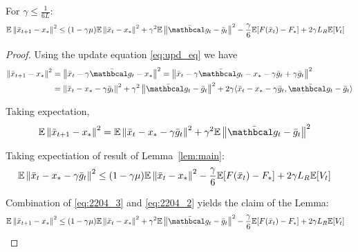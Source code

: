 \begin{lemma} \label{lem:very_main}
    For $\gamma \leq \frac{1}{6L}$:
    \begin{align}
        \E \norm{\bar{x}_{t+1}-x_*}^2
        &\leq (1 - \gamma \mu) \E \norm{\bar{x}_t - x_*}^2 
        + \gamma^2 \E \norm{ \bar{\mc{g_t}} - \bar{g}_t}^2
        - \frac{\gamma}{6} \E [F(\bar{x}_t) - F_*] 
        + 2 \gamma L_R \E [V_t]
    \end{align}
\end{lemma}
\begin{proof}
    Using the update equation \eqref{eq:upd_eq} we have
    \begin{align}
        \norm{\bar{x}_{t+1}-x_*}^2
        &= \norm{\bar{x}_{t} - \gamma \bar {\mc{g_t}} - x_*}^2
        = \norm{\bar{x}_{t} - \gamma \bar {\mc{g_t}} - x_* - \gamma \bar{g}_t + \gamma \bar{g}_t}^2 \\
        &= \norm{\bar{x}_t - x_* - \gamma \bar{g}_t}^2 
        + \gamma^2 \norm{\bar {\mc{g_t}} - \bar{g}_t}^2
        + 2 \gamma \inner{\bar{x}_t - x_* - \gamma \bar{g}_t}{\bar {\mc{g_t}} - \bar{g}_t}
    \end{align}
    
    Taking expectation, 
    \begin{align}
        \E \norm{\bar{x}_{t+1}-x_*}^2
        &= \E \norm{\bar{x}_t - x_* - \gamma \bar{g}_t}^2
        + \gamma^2 \E \norm{ \bar {\mc{g_t}} - \bar{g}_t}^2 \label{eq:2204_3}
    \end{align}
    
    
    Taking expectiation of result of Lemma~\ref{lem:main}:
    \begin{align}
        \mathbb{E} \left\|\bar{x}_t - x_* - \gamma \bar{g}_t\right\|^2 
        &\leq (1 - \gamma \mu) \mathbb{E} \left\|\bar{x}_t - x_*\right\|^2 
        - \frac{\gamma}{6} \mathbb{E} [F(\bar{x}_t) - F_*] 
        + 2 \gamma L_R \mathbb{E} [V_t] \label{eq:2204_2}
    \end{align}

    Combination of \eqref{eq:2204_3} and \eqref{eq:2204_2} yields the claim of the Lemma:
    \begin{align}
         \E \norm{\bar{x}_{t+1}-x_*}^2
        &\leq (1 - \gamma \mu) \E \norm{\bar{x}_t - x_*}^2 
        + \gamma^2 \E \norm{ \bar{\mc{g_t}} - \bar{g}_t}^2
        - \frac{\gamma}{6} \E [F(\bar{x}_t) - F_*] 
        + 2 \gamma L_R \E [V_t]
    \end{align}
\end{proof}